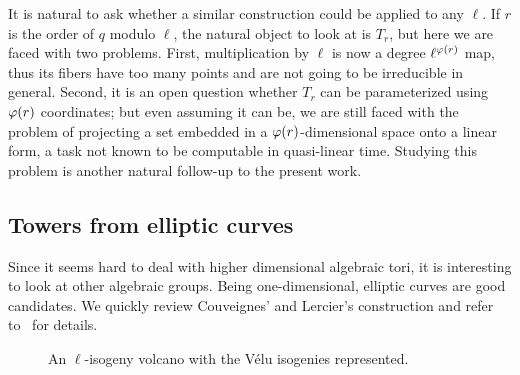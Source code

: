 \documentclass{sig-alternate}
\begin{document}
It is natural to ask whether a similar construction could be applied
to any $\ell$. If $r$ is the order of $q$ modulo $\ell$, the natural
object to look at is $T_r$, but here we are faced with two
problems. First, multiplication by $\ell$ is now a degree
$\ell^{\varphi(r)}$ map, thus its fibers have too many points and are
not going to be irreducible in general. Second, it is an open question
whether $T_r$ can be parameterized using $\varphi(r)$ coordinates; but
even assuming it can be, we are still faced with the problem of
projecting a set embedded in a $\varphi(r)$-dimensional space onto a
linear form, a task not known to be computable in quasi-linear
time. Studying this problem is another natural follow-up to the
present work.


\subsection{Towers from elliptic curves}

Since it seems hard to deal with higher dimensional algebraic tori, it
is interesting to look at other algebraic groups. Being
one-dimensional, elliptic curves are good candidates. We quickly
review Couveignes' and Lercier's construction and refer
to~\cite{couveignes+lercier11} for details.

\begin{figure}
  \centering
  \caption{An $\ell$-isogeny volcano with the Vélu isogenies
    represented.}
  \label{fig:volcano}
\end{figure}
\end{document}
